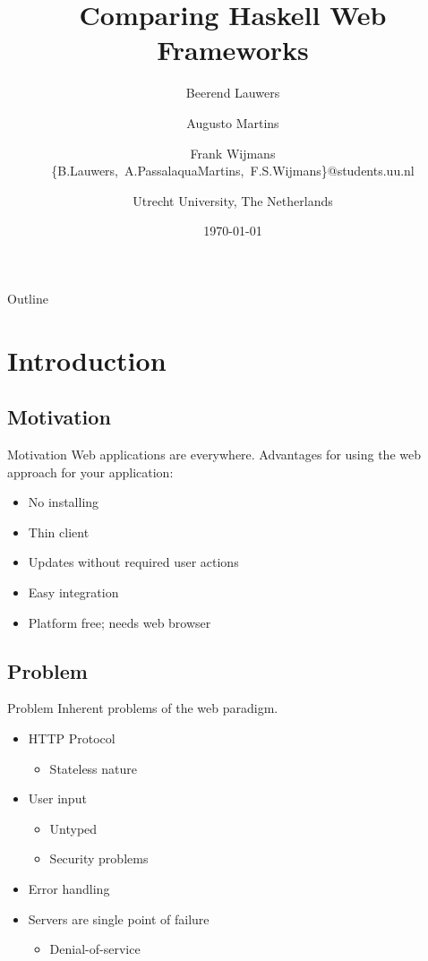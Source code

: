 \documentclass[10pt,usenames,dvipsnames]{beamer}
\author{
	Beerend Lauwers\\
	\and 
	Augusto Martins\\	
	\and
	Frank Wijmans\newline\\
	\hbox{\{B.Lauwers, A.PassalaquaMartins, F.S.Wijmans\}@students.uu.nl}
	\and
	\newline Utrecht University, The Netherlands}
\date{\today}
\title{Comparing Haskell Web Frameworks}
\begin{document}
	\frame{\titlepage}

	\begin{frame}{Outline}
		\tableofcontents
	\end{frame}
	
	\section{Introduction}
	
	\subsection*{Motivation}
	
	\begin{frame}{Motivation}
		Web applications are everywhere.
		Advantages for using the web approach for your application:
		\begin{itemize}
			\item No installing
			\item Thin client
			\item Updates without required user actions
			\item Easy integration
			\item Platform free; needs web browser
		\end{itemize}
	\end{frame}
	
	\subsection*{Problem}
	
	\begin{frame}{Problem}
		Inherent problems of the web paradigm.
		\begin{itemize}
			\item HTTP Protocol
			\begin{itemize}
			\item Stateless nature
			\end{itemize}
			\item User input
			\begin{itemize}
			\item Untyped
			\item Security problems
			\end{itemize}
			\item Error handling
			\item Servers are single point of failure
			\begin{itemize}
			\item Denial-of-service
			\end{itemize}
		\end{itemize}
	\end{frame}
	
\end{document}
